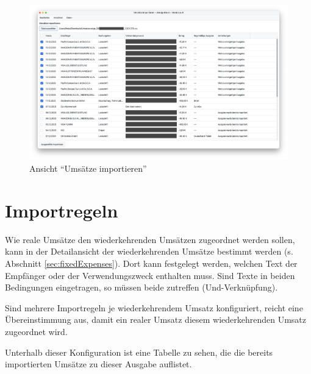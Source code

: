\begin{figure}[ht!]
	\centering
	\includegraphics[width=\textwidth]{img/Screenshot-ImportView}
	\vspace{-2em}
	\caption{Ansicht "`Umsätze importieren"'}
	\label{fig:ImportView}
\end{figure}

\section{Importregeln}

Wie reale Umsätze den wiederkehrenden Umsätzen zugeordnet werden sollen, kann in der Detailansicht der wiederkehrenden Umsätze bestimmt werden (s. Abschnitt \ref{sec:fixedExpenses}). Dort kann festgelegt werden, welchen Text der Empfänger oder der Verwendungszweck enthalten muss. Sind Texte in beiden Bedingungen eingetragen, so müssen beide zutreffen (Und-Verknüpfung). 

Sind mehrere Importregeln je wiederkehrendem Umsatz konfiguriert, reicht eine Übereinstimmung aus, damit ein realer Umsatz diesem wiederkehrenden Umsatz zugeordnet wird. 

Unterhalb dieser Konfiguration ist eine Tabelle zu sehen, die die bereits importierten Umsätze zu dieser Ausgabe auflistet. 